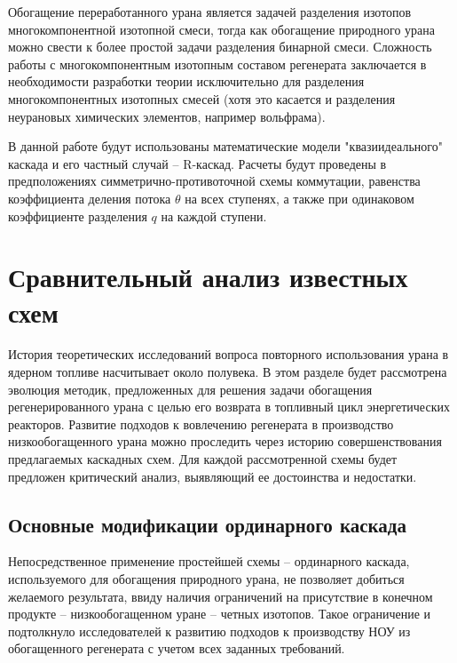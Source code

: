 Обогащение переработанного урана является задачей разделения изотопов многокомпонентной изотопной смеси, тогда как обогащение природного урана можно свести к более простой задачи разделения бинарной смеси. Сложность работы с многокомпонентным изотопным составом регенерата заключается в необходимости разработки теории исключительно для разделения многокомпонентных изотопных смесей (хотя это касается и разделения неурановых химических элементов, например вольфрама).

В данной работе будут использованы математические модели "квазиидеального" каскада и его частный случай -- R-каскад. Расчеты будут проведены в предположениях симметрично-противоточной схемы коммутации, равенства коэффициента деления потока $\theta$ на всех ступенях, а также при одинаковом коэффициенте разделения $q$ на каждой ступени.

\section{Сравнительный анализ известных схем}

История теоретических исследований вопроса повторного использования урана в ядерном топливе насчитывает около полувека.
В этом разделе будет рассмотрена эволюция методик, предложенных для решения задачи обогащения регенерированного урана с целью его возврата в топливный цикл энергетических реакторов.
Развитие подходов к вовлечению регенерата в производство низкообогащенного урана можно проследить через историю совершенствования предлагаемых каскадных схем.
Для каждой рассмотренной схемы будет предложен критический анализ, выявляющий ее достоинства и недостатки.

\subsection{Основные модификации ординарного каскада}

Непосредственное применение простейшей схемы -- ординарного каскада, используемого для обогащения природного урана, не позволяет добиться желаемого результата, ввиду наличия ограничений на присутствие в конечном продукте -- низкообогащенном уране -- четных изотопов. Такое ограничение и подтолкнуло исследователей к развитию подходов к производству НОУ из обогащенного регенерата с учетом всех заданных требований.

